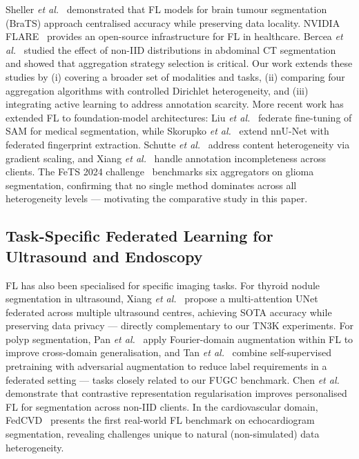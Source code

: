 Sheller \emph{et al.}~\cite{sheller2018federated} demonstrated that FL
models for brain tumour segmentation (BraTS) approach centralised accuracy
while preserving data locality.
NVIDIA FLARE~\cite{nvidia2019clara} provides an open-source infrastructure
for FL in healthcare.
Bercea \emph{et al.}~\cite{bercea2022federated} studied the effect of
non-IID distributions in abdominal CT segmentation and showed that
aggregation strategy selection is critical.
Our work extends these studies by (i) covering a broader set of modalities
and tasks, (ii) comparing four aggregation algorithms with controlled
Dirichlet heterogeneity, and (iii) integrating active learning to address
annotation scarcity.
More recent work has extended FL to foundation-model architectures:
Liu \emph{et al.}~\cite{liu2024fedfms} federate fine-tuning of SAM for
medical segmentation, while Skorupko \emph{et al.}~\cite{skorupko2025fednnunet}
extend nnU-Net with federated fingerprint extraction.
Schutte \emph{et al.}~\cite{schutte2024fedgs} address content heterogeneity
via gradient scaling, and Xiang \emph{et al.}~\cite{xiang2024fedia} handle
annotation incompleteness across clients.
The FeTS 2024 challenge~\cite{linardos2024fets} benchmarks six aggregators
on glioma segmentation, confirming that no single method dominates across
all heterogeneity levels --- motivating the comparative study in this paper.

\subsection{Task-Specific Federated Learning for Ultrasound and Endoscopy}

FL has also been specialised for specific imaging tasks.
For thyroid nodule segmentation in ultrasound, Xiang \emph{et al.}~\cite{xiang2025maunet}
propose a multi-attention UNet federated across multiple ultrasound centres,
achieving SOTA accuracy while preserving data privacy --- directly
complementary to our TN3K experiments.
For polyp segmentation, Pan \emph{et al.}~\cite{pan2025fdgpolyp} apply
Fourier-domain augmentation within FL to improve cross-domain generalisation,
and Tan \emph{et al.}~\cite{tan2025fedsemidg} combine self-supervised
pretraining with adversarial augmentation to reduce label requirements in a
federated setting --- tasks closely related to our FUGC benchmark.
Chen \emph{et al.}~\cite{chen2025pcrfed} demonstrate that contrastive
representation regularisation improves personalised FL for segmentation
across non-IID clients.
In the cardiovascular domain, FedCVD~\cite{zhang2024fedcvd} presents the
first real-world FL benchmark on echocardiogram segmentation, revealing
challenges unique to natural (non-simulated) data heterogeneity.

